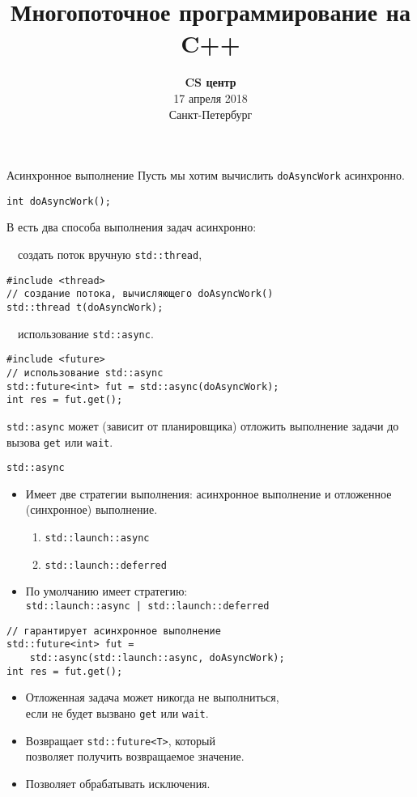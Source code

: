\documentclass{beamer}
\title{Многопоточное программирование на C++}
\date{
   \textbf{CS центр}\\
   17 апреля 2018 \\
   Санкт-Петербург
}
\newcommand{\fakeitem}{\par{\color{MOOCBlue}\textbullet}\ \ }
\begin{document}
\begin{frame} 
  \titlepage
\end{frame}

\begin{frame}[fragile]{Асинхронное выполнение}
Пусть мы хотим вычислить \texttt{doAsyncWork} асинхронно.
\begin{lstlisting}
int doAsyncWork();
\end{lstlisting}

В \langcpp есть два способа выполнения задач асинхронно:\medskip

\fakeitem создать поток вручную \texttt{std::thread},
   
\begin{lstlisting}
#include <thread>
// создание потока, вычисляющего doAsyncWork()
std::thread t(doAsyncWork);
\end{lstlisting}

\fakeitem использование \texttt{std::async}.
\begin{lstlisting}
#include <future>
// использование std::async
std::future<int> fut = std::async(doAsyncWork);
int res = fut.get();
\end{lstlisting}

\texttt{std::async} может (зависит от планировщика) отложить выполнение задачи до вызова \texttt{get} или \texttt{wait}.
\end{frame}

\begin{frame}[fragile]{\texttt{std::async}}
    \begin{itemize}
        \item Имеет две стратегии выполнения: асинхронное выполнение и
            отложенное (синхронное) выполнение.
                \begin{enumerate}
                    \item \texttt{std::launch::async}
                    \item \texttt{std::launch::deferred}
                \end{enumerate}
        \item По умолчанию имеет стратегию:\\
             \texttt{std::launch::async | std::launch::deferred}
\end{itemize}
\begin{lstlisting}
// гарантирует асинхронное выполнение
std::future<int> fut = 
    std::async(std::launch::async, doAsyncWork);
int res = fut.get();
\end{lstlisting}
\begin{itemize}
        \item Отложенная задача может никогда не выполниться,\\
            если не будет вызвано \texttt{get} или \texttt{wait}.

        \item Возвращает \texttt{std::future<T>}, который\\ позволяет
            получить возвращаемое значение.
            
        \item Позволяет обрабатывать исключения.
    \end{itemize}
\end{frame}
\end{document}
